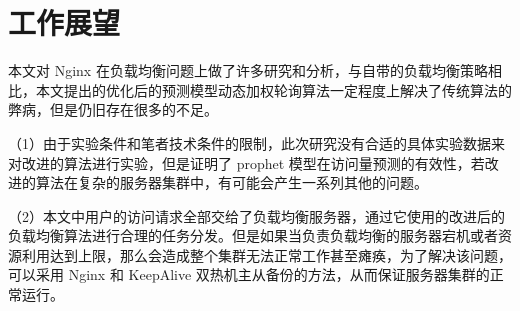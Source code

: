 \section{工作展望}

本文对 Nginx 在负载均衡问题上做了许多研究和分析，与自带的负载均衡策略相比，本文提出的优化后的预测模型动态加权轮询算法一定程度上解决了传统算法的弊病，但是仍旧存在很多的不足。

（1）由于实验条件和笔者技术条件的限制，此次研究没有合适的具体实验数据来对改进的算法进行实验，但是证明了 prophet 模型在访问量预测的有效性，若改进的算法在复杂的服务器集群中，有可能会产生一系列其他的问题。

（2）本文中用户的访问请求全部交给了负载均衡服务器，通过它使用的改进后的负载均衡算法进行合理的任务分发。但是如果当负责负载均衡的服务器宕机或者资源利用达到上限，那么会造成整个集群无法正常工作甚至瘫痪，为了解决该问题，可以采用 Nginx 和 KeepAlive 双热机主从备份的方法，从而保证服务器集群的正常运行。
